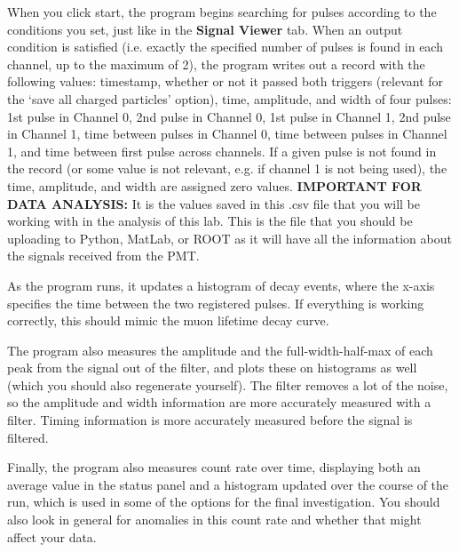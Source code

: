 \documentclass{../lab}
\begin{document}
When you click start, the program begins searching for pulses according to the conditions you set, just like in the \textbf{Signal Viewer} tab. When an output condition is satisfied (i.e. exactly the specified number of pulses is found in each channel, up to the maximum of 2), the program writes out a record with the following values: timestamp, whether or not it passed both triggers (relevant for the `save all charged particles' option), time, amplitude, and width of four pulses: 1st pulse in Channel 0, 2nd pulse in Channel 0, 1st pulse in Channel 1, 2nd pulse in Channel 1, time between pulses in Channel 0, time between pulses in Channel 1, and time between first pulse across channels. If a given pulse is not found in the record (or some value is not relevant, e.g. if channel 1 is not being used), the time, amplitude, and width are assigned zero values. \textbf{IMPORTANT FOR DATA ANALYSIS:} It is the values saved in this .csv file that you will be working with in the analysis of this lab. This is the file that you should be uploading to Python, MatLab, or ROOT as it will have all the information about the signals received from the PMT.

As the program runs, it updates a histogram of decay events, where the x-axis specifies the time between the two registered pulses. If everything is working correctly, this should mimic the muon lifetime decay curve.

The program also measures the amplitude and the full-width-half-max of each peak from the signal out of the filter, and plots these on histograms as well (which you should also regenerate yourself). The filter removes a lot of the noise, so the amplitude and width information are more accurately measured with a filter. Timing information is more accurately measured before the signal is filtered.

Finally, the program also measures count rate over time, displaying both an average value in the status panel and a histogram updated over the course of the run, which is used in some of the options for the final investigation. You should also look in general for anomalies in this count rate and whether that might affect your data.
\end{document}
